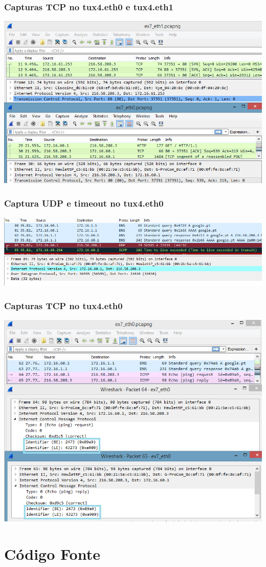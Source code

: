 \documentclass[11pt,a4paper,reqno]{report}
\numberwithin{equation}{section}
\begin{document}
\begin{appendices}
\subsection{Capturas TCP no tux4.eth0 e tux4.eth1}
\label{ex7_tcp}
\includegraphics[width=16cm]{ex7_TCP.png}
\subsection{Captura UDP e timeout no tux4.eth0}
\label{ex7_udp}
\includegraphics[width=16cm]{ex7_udp_timeout.png}
\subsection{Capturas TCP no tux4.eth0}
\label{ex7_ping}
\includegraphics[width=16cm]{ex7_ping.png}

\chapter{Código Fonte}








\end{appendices}
\end{document}
